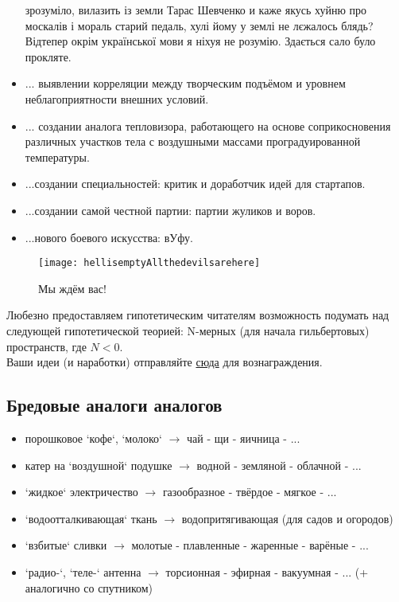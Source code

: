 \begin{itemize}
{            зрозуміло, вилазить із земли Тарас Шевченко и каже якусь хуйню про москалів і мораль старий педаль, 
            хулі йому у землі не лєжалось блядь? Відтепер окрім української мови я ніхуя не розумію. Здається 
            сало було прокляте.}
    \item ... выявлении корреляции между творческим подъёмом и уровнем неблагоприятности внешних условий.
    \item ... создании аналога тепловизора, работающего на основе соприкосновения различных участков тела с воздушными массами проградуированной температуры.
    \item ...создании специальностей: критик и доработчик идей для стартапов.
    \item ...создании самой честной партии: партии жуликов и воров.
    \item ...нового боевого искусства: вУфу.
\end{itemize}
\begin{figure}[ht!]
    \centering
    \texttt{[image: hellisemptyAllthedevilsarehere]}
    \caption{Мы ждём вас!}
\end{figure}

Любезно предоставляем гипотетическим читателям возможность подумать над следующей гипотетической теорией:
N-мерных (для начала гильбертовых) пространств, где \( N < 0 \).\\
Ваши идеи (и наработки) отправляйте \href{http://www.abelprize.no/}{сюда} для вознаграждения.

\subsection{Бредовые аналоги аналогов}
\begin{itemize}
\item порошковое `кофе`, `молоко` \( \to \) чай - щи - яичница - ...
\item катер на `воздушной` подушке \( \to \) водной - земляной - облачной - ...
\item `жидкое` электричество \( \to \) газообразное - твёрдое - мягкое - ...
\item `водоотталкивающая` ткань \( \to \) водопритягивающая (для садов и огородов)
\item `взбитые` сливки \( \to \) молотые - плавленные - жаренные - варёные - ...
\item `радио-`, `теле-` антенна \( \to \) торсионная - эфирная - вакуумная - ... (+ аналогично со спутником)
\end{itemize}
